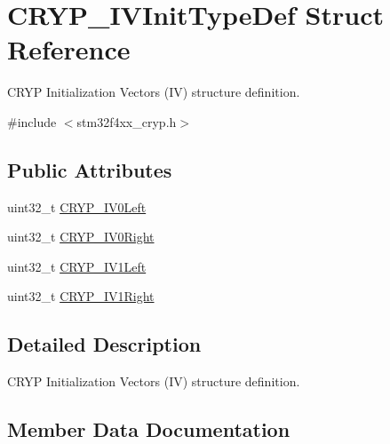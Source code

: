 \hypertarget{struct_c_r_y_p___i_v_init_type_def}{}\section{C\+R\+Y\+P\+\_\+\+I\+V\+Init\+Type\+Def Struct Reference}
\label{struct_c_r_y_p___i_v_init_type_def}


C\+R\+Y\+P Initialization Vectors (I\+V) structure definition.  




{\ttfamily \#include $<$stm32f4xx\+\_\+cryp.\+h$>$}

\subsection*{Public Attributes}
\begin{DoxyCompactItemize}
\item 
uint32\+\_\+t \hyperlink{struct_c_r_y_p___i_v_init_type_def_a36a3734747b9c32e2cde67cb54be02f8}{C\+R\+Y\+P\+\_\+\+I\+V0\+Left}
\item 
uint32\+\_\+t \hyperlink{struct_c_r_y_p___i_v_init_type_def_ad7128fb8cf3843c2e0f89cf048cd28d5}{C\+R\+Y\+P\+\_\+\+I\+V0\+Right}
\item 
uint32\+\_\+t \hyperlink{struct_c_r_y_p___i_v_init_type_def_a5edca0a5d021ee77fcfcdf9e29e27a53}{C\+R\+Y\+P\+\_\+\+I\+V1\+Left}
\item 
uint32\+\_\+t \hyperlink{struct_c_r_y_p___i_v_init_type_def_a936f532460c581298620960b511aa448}{C\+R\+Y\+P\+\_\+\+I\+V1\+Right}
\end{DoxyCompactItemize}


\subsection{Detailed Description}
C\+R\+Y\+P Initialization Vectors (I\+V) structure definition. 

\subsection{Member Data Documentation}
\hypertarget{struct_c_r_y_p___i_v_init_type_def_a36a3734747b9c32e2cde67cb54be02f8}{}
